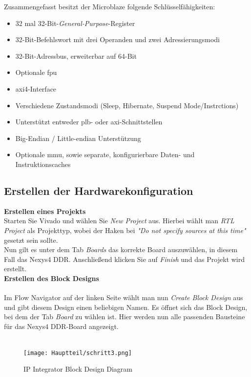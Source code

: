 Zusammengefasst besitzt der Microblaze folgende Schlüsselfähigkeiten:
\begin{itemize}
  \item 32 mal 32-Bit-\emph{General-Purpose}-Register
  \item 32-Bit-Befehlswort mit drei Operanden und zwei Adressierungsmodi
  \item 32-Bit-Adressbus, erweiterbar auf 64-Bit
  \item Optionale \ac{fpu}
  \item \ac{axi}4-Interface
  \item Verschiedene Zustandsmodi (Sleep, Hibernate, Suspend Mode/Instrctions)
  \item Unterstützt entweder \ac{plb}- oder \ac{axi}-Schnittstellen
  \item Big-Endian / Little-endian Unterstützung
  \item Optionale \ac{mmu}, sowie separate, konfigurierbare Daten- und Instruktionscaches
\end{itemize}


\subsection{Erstellen der Hardwarekonfiguration}\label{kap:microblazehardware}


\textbf{Erstellen eines Projekts}\\

Starten Sie Vivado und wählen Sie \emph{New Project} aus.
Hierbei wählt man \emph{RTL Project} als Projekttyp, wobei der Haken bei \emph{"Do not specify sources at this time"} gesetzt sein sollte.\\
Nun gilt es unter dem Tab \emph{Boards} das korrekte Board auszuwählen, in diesem Fall das Nexys4 DDR.
Anschließend klicken Sie auf \emph{Finish} und das Projekt wird erstellt.\\


\newpage
\textbf{Erstellen des Block Designs}\\\\
Im Flow Navigator  auf der linken Seite wählt man nun \emph{Create Block Design} aus und
 gibt diesem Design einen beliebigen Namen.
Es öffnet sich das Block Design, bei dem der Tab \emph{Board} zu wählen ist. Hier werden nun
alle passenden Bausteine für das Nexys4 DDR-Board angezeigt.\\\\

\begin{figure}[H]
\centering
\texttt{[image: Hauptteil/schritt3.png]}
\caption{IP Integrator Block Design Diagram}\label{fig:mbschritt3}
\end{figure}

